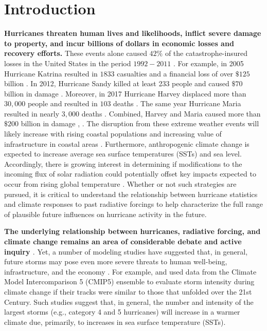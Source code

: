 \documentclass[smallextended]{svjour3}       %
\begin{document}
\section{Introduction}
\label{intro}
\par
\textbf{Hurricanes threaten human lives and likelihoods, inflict severe damage
to property, and incur billions of dollars in economic losses and
recovery efforts.} These events alone caused $42\%$ of the
catastrophe-insured losses in the United States in the period
$1992-2011$ \cite{hodges2017well}. For example, in 2005 Hurricane Katrina
resulted in $1833$ casualties and a financial loss of over $\$125$
billion \cite{hodges2017well}. In 2012, Hurricane Sandy killed at least
233 people and caused $\$70$ billion in damage
\cite{blake2013tropical}. Moreover, in 2017 Hurricane Harvey displaced more
than $30,000$ people and resulted in $103$ deaths
\cite{murphy2018service}. The same year Hurricane Maria resulted in nearly
$3,000$ deaths \cite{maria_rpt}. Combined, Harvey and Maria caused
more than $\$200$ billion in damage \cite{murphy2018service},
\cite{maria_rpt}. The disruption from these extreme weather events
will likely increase with rising coastal populations and increasing
value of infrastructure in coastal areas
\cite{kerry_tc_clim}. Furthermore, anthropogenic climate change is
expected to increase average sea surface temperatures (SSTs)
\cite{ipcc_2007} and sea level. Accordingly, there is growing interest
in determining if modifications to the incoming flux of solar
radiation could potentially offset key impacts expected to occur from
rising global temperature \cite{REF}. %
Whether or not
such strategies are pursued, it is critical to understand the
relationship between hurricane statistics and climate responses to
past radiative forcings to help characterize the full
range of plausible future influences on hurricane activity in the
future.
\par


\textbf{The underlying relationship between hurricanes, radiative
  forcing, and climate change remains an area of considerable debate
  and active inquiry \cite{REF,REF,REF}}. Yet, a number of modeling
studies have suggested that, in general, future storms may pose even
more severe threats to human well-being, infrastructure, and the
economy \cite{IPCC2014c}. For example, \cite{REF} and \cite{REF} used
data from the Climate Model Intercomparison 5 (CMIP5) ensemble to
evaluate storm intensity during climate change if their tracks were
similar to those that unfolded over the 21st Century. Such studies
suggest that, in general, the number and intensity of the largest
storms (e.g., category 4 and 5 hurricanes) will increase in a warmer
climate due, primarily, to increases in sea surface temperature
(SSTs). 
\end{document}
